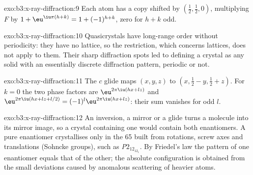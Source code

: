 \begin{solution}{exo:b3:x-ray-diffraction:9}
Each atom has a copy shifted by $(\frac12,\frac12,0)$, multiplying $F$ by $1 +
\eu^{\iu\pi(h+k)} = 1 + (-1)^{h+k}$, zero for $h + k$ odd.
\end{solution}

\begin{solution}{exo:b3:x-ray-diffraction:10}
Quasicrystals have long-range order without periodicity: they have no
lattice, so the restriction, which concerns lattices, does not apply to them.
Their sharp diffraction spots led to defining a crystal as any solid with an
essentially discrete diffraction pattern, periodic or not.
\end{solution}

\begin{solution}{exo:b3:x-ray-diffraction:11}
The $c$ glide maps $(x, y, z)$ to $(x, \frac12 - y, \frac12 + z)$. For $k = 0$ the two
phase factors are $\eu^{2\pi\iu(hx + lz)}$ and $\eu^{2\pi\iu(hx + lz + l/2)} = (-1)^l
\eu^{2\pi\iu(hx+lz)}$: their sum vanishes for odd $l$.
\end{solution}

\begin{solution}{exo:b3:x-ray-diffraction:12}
An inversion, a mirror or a glide turns a molecule into its mirror image, so a
crystal containing one would contain both enantiomers. A pure enantiomer
crystallises only in the 65  built from rotations, screw axes
and translations (Sohncke groups), such as \textit{P}$2_12_12_1$. By Friedel's law the
pattern of one enantiomer equals that of the other; the absolute
configuration is obtained from the small deviations caused by anomalous
scattering of heavier atoms.
\end{solution}

